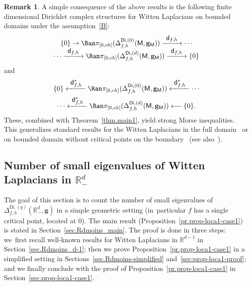 \documentclass[10pt]{amsart}
\newcommand\from{\mathchoice{\longleftarrow}{\leftarrow}{\leftarrow}{\leftarrow}}
\newcommand\To[1]{\mathchoice{\xrightarrow{\textstyle\kern4pt#1\kern3pt}}{\stackrel{#1}{\longrightarrow}}{}{}}
\newcommand\From[1]{\mathchoice{\xleftarrow{\textstyle~#1~}}{\stackrel{#1}{\longleftarrow}}{}{}}
\newcommand{\mbf}[1]{\mathbf{#1}}
\theoremstyle{plain}
\theoremstyle{definition}
\newtheorem{remark}[proposition]{Remark}
\begin{document}
\begin{remark}\label{rem:Morse}
A simple consequence of the above results is the following finite
dimensional Dirichlet complex structures for Witten Laplacians on
bounded domains under the assumption~\ref{B}:
\begin{multline*}\vspace*{-5pt}
\{0\} \to
\Ran \pi_{[0,ch]}(\Delta^{\mathsf{Di},(0)}_{f,h}(\mathsf M,\mbf
g_{\mathsf M})) \To{\mathsf d_{f,h}}\cdots\\
\cdots
\To{\mathsf d_{f,h}}
\Ran \pi_{[0,ch]}(\Delta^{\mathsf{Di},(d)}_{f,h}(\mathsf M,\mbf
g_{\mathsf M})) \To{\mathsf d_{f,h}}\{0\}
\end{multline*}
and\vspace*{-5pt}
\begin{multline*}
\{0\} \From{\mathsf d_{f,h}^*}
\Ran \pi_{[0,ch]}(\Delta^{\mathsf{Di},(0)}_{f,h}(\mathsf M,\mbf g_{\mathsf
M})) \From{\mathsf d_{f,h}^*} \cdots\\
\cdots \From{\mathsf
d_{f,h}^*} \Ran \pi_{[0,ch]}(\Delta^{\mathsf{Di},(d)}_{f,h}(\mathsf
M,\mbf g_{\mathsf M})) \from\{0\}.
\end{multline*}
These, combined with Theorem~\ref{thm.main1}, yield strong Morse
inequalities. This generalizes standard results for the Witten Laplacians in the
full domain~\cite{helffer-sjostrand-85,CFKS,witten-82} or on bounded domain without critical points on
the
boundary~\cite{helffer-nier-06,le-peutrec-10} (see also~\cite{laudenbach2011morse,CL}).
\end{remark}

\subsection{Number of small eigenvalues of Witten Laplacians in $\mathbb R^d_-$}\label{sec.Rdmoins}

The goal of this section is to
count the number of small eigenvalues of $\Delta_{f,h}^{\mathsf{Di},(q)} (\mathbb R^d_-,\mbf g)$ in a simple geometric setting (in~particular
$f$ has a single critical point, located at $0$). The main result
(Proposition~\ref{pr.prop-loca1-case1}) is
stated in Section~\ref{sec.Rdmoins_main}. The proof is done in three
steps: we~first recall well-known results for Witten Laplacians in
$\mathbb R^{d-1}$ in Section~\ref{sec.Rdmoins_d-1}; then we prove Proposition~\ref{pr.prop-loca1-case1}
in a simplified setting in Sections~\ref{sec.Rdmoins-simplified}
and~\ref{sec:prop-loca1-proof}; and we finally conclude with the proof
of Proposition~\ref{pr.prop-loca1-case1} in Section~\ref{sec.prop-loca1-case1}.
\end{document}
